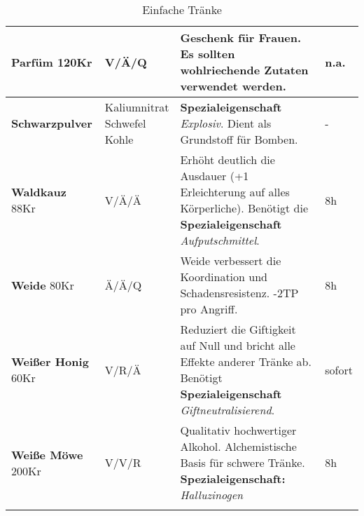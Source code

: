 \begin{longtable}{|p{3cm}|p{}|p{8cm}|p{}|}
\textbf{Parfüm} 120Kr & V/Ä/Q & Geschenk für Frauen. Es sollten wohlriechende Zutaten verwendet werden. & n.a. \\ \hline

\textbf{Schwarzpulver} & \brcell{Kaliumnitrat \\ Schwefel \\ Kohle} & \textbf{Spezialeigenschaft} \textit{Explosiv}. Dient als Grundstoff für Bomben. & - \\ \hline

\textbf{Waldkauz} 88Kr & V/Ä/Ä & Erhöht deutlich die Ausdauer (+1 Erleichterung auf alles Körperliche). Benötigt die \textbf{Spezialeigenschaft} \textit{Aufputschmittel}. & 8h \\ \hline

\textbf{Weide} 80Kr & Ä/Ä/Q & Weide verbessert die Koordination und Schadensresistenz. -2TP pro Angriff. & 8h \\ \hline

\textbf{Weißer Honig} 60Kr & V/R/Ä & Reduziert die Giftigkeit auf Null und bricht alle Effekte anderer Tränke ab. Benötigt \textbf{Spezialeigenschaft} \textit{Giftneutralisierend}. & sofort \\ \hline

\textbf{Weiße Möwe} 200Kr & V/V/R & Qualitativ hochwertiger Alkohol. Alchemistische Basis für schwere Tränke. \textbf{Spezialeigenschaft:} \textit{Halluzinogen} & 8h \\ \hline

\caption{Einfache Tränke}
\label{tab:einfache_traenke}
\end{longtable}

